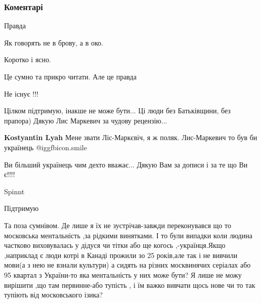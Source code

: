  
 
 
 
 
\subsubsection{Коментарі}
\label{sec:22_10_2021.fb.przemyslaw_lis_markiewicz.1.rusjazyk_ukraincy.cmt}

\begin{itemize} %
Правда

Як говорять не в брову, а в око.

Коротко і ясно.

Це сумно та прикро читати. Але це правда

Не існує !!!


Цілком підтримую, інакше не може бути... Ці люди без Батьківщини, без прапора)
Дякую Лис Маркевич за чудову рецензію...

\begin{itemize} %
\textbf{Kostyantin Lyah} Мене звати Ліс-Маркєвіч, я ж поляк. Лис-Маркевич то був би українець  @igg{fbicon.smile} 


Ви більший українець чим дехто вважає...
Дякую Вам за дописи і за те що Ви є!!!!
\end{itemize} %

Spinnt

Підтримую


Та поза сумнівом. Де лише я їх не зустрічав-завжди переконувався що то
московська ментальність ,за рідкими винятками. І то були випадки коли людина
частково виховувалась у дідуся чи тітки або ще когось ,-українця.Якщо
,наприклад є люди котрі в Канаді прожили зо 25 років,але так і не вивчили
мови(а з нею не взнали культури) а сидять на різних москвинячих серіалах або 95
квартал з України-то яка ментальність у них може бути? Я лише не можу вирішити
,що там первинне-або тупість , і їм важко вивчати щось нове чи то так тупіють
від московського ізика?


\end{itemize}
